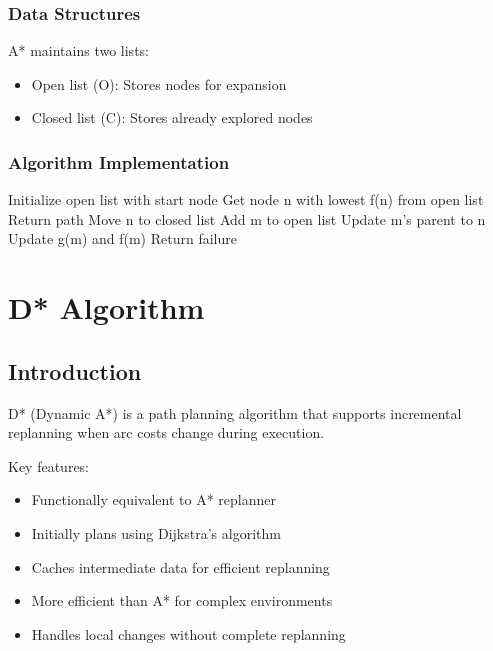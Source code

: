 \documentclass[openany]{book}
\theoremstyle{definition}
\theoremstyle{remark}
\newcommand{\definitionbox}[1]{
\begin{tcolorbox}[colback=blue!5,colframe=blue!40!black,title=Definition]
 #1
\end{tcolorbox}
}
\begin{document}
\subsubsection{Data Structures}
A* maintains two lists:
\begin{itemize}
    \item Open list (O): Stores nodes for expansion
    \item Closed list (C): Stores already explored nodes
\end{itemize}

\subsubsection{Algorithm Implementation}
\begin{algorithmic}[1]
\State Initialize open list with start node
    \State Get node n with lowest f(n) from open list
        \State Return path
    \EndIf
    \State Move n to closed list
                \State Add m to open list
            \Else
                    \State Update m's parent to n
                    \State Update g(m) and f(m)
                \EndIf
            \EndIf
        \EndIf
    \EndFor
\EndWhile
\State Return failure
\end{algorithmic}

\section{D* Algorithm}

\subsection{Introduction}
\definitionbox{D* (Dynamic A*) is a path planning algorithm that supports incremental replanning when arc costs change during execution.}

Key features:
\begin{itemize}
    \item Functionally equivalent to A* replanner
    \item Initially plans using Dijkstra's algorithm
    \item Caches intermediate data for efficient replanning
    \item More efficient than A* for complex environments
    \item Handles local changes without complete replanning
\end{itemize}
\end{document}
